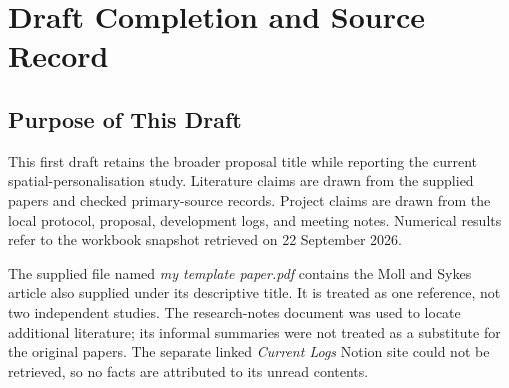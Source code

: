 \appendix
\renewcommand{\appendixtocname}{Appendix}
\renewcommand{\appendixpagename}{\appendixtocname}
\addappheadtotoc
{}
\appendixpage

\chapter{Draft Completion and Source Record}
\label{app:completion}
\section{Purpose of This Draft}
This first draft retains the broader proposal title while reporting the current spatial-personalisation study. Literature claims are drawn from the supplied papers and checked primary-source records. Project claims are drawn from the local protocol, proposal, development logs, and meeting notes. Numerical results refer to the workbook snapshot retrieved on 22 September 2026.

The supplied file named \emph{my template paper.pdf} contains the Moll and Sykes article also supplied under its descriptive title. It is treated as one reference, not two independent studies. The research-notes document was used to locate additional literature; its informal summaries were not treated as a substitute for the original papers. The separate linked \emph{Current Logs} Notion site could not be retrieved, so no facts are attributed to its unread contents.

